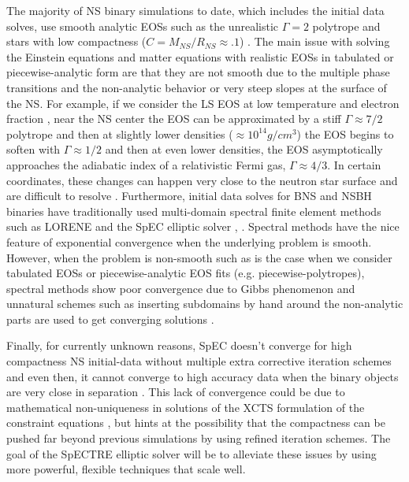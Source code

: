 
 The majority of NS binary simulations to date, which includes the initial data solves, use smooth analytic EOSs such as the unrealistic $\Gamma = 2$ polytrope and stars with low compactness ($C = M_{NS}/R_{NS} \approx .1$) \cite{faber2012binary}. The main issue with solving the Einstein equations and matter equations with realistic EOSs in tabulated or piecewise-analytic form are that they are not smooth due to the multiple phase transitions and the non-analytic behavior or very steep slopes at the surface of the NS. For example, if we consider the LS EOS at low temperature and electron fraction \cite{lswebsite}, near the NS center the EOS can be approximated by a stiff $\Gamma \approx 7/2$ polytrope and then at slightly lower densities ($\approx 10^{14} g/cm^{3}$) the EOS begins to soften with $\Gamma \approx 1/2$ and then at even lower densities, the EOS asymptotically approaches the adiabatic index of a relativistic Fermi gas, $\Gamma \approx 4/3$. In certain coordinates, these changes can happen very close to the neutron star surface and are difficult to resolve \cite{deaton2013black}. Furthermore, initial data solves for BNS and NSBH binaries have traditionally used multi-domain spectral finite element methods such as LORENE \cite{gourgoulhon2001quasiequilibrium} and the SpEC elliptic solver \cite{pfeiffer2003multidomain}, \cite{ossokine2015improvements}. Spectral methods have the nice feature of exponential convergence when the underlying problem is smooth. However, when the problem is non-smooth such as is the case when we consider tabulated EOSs or piecewise-analytic EOS fits (e.g. piecewise-polytropes), spectral methods show poor convergence due to Gibbs phenomenon and unnatural schemes such as inserting subdomains by hand around the non-analytic parts are used to get converging solutions \cite{deaton2013black}. 

Finally, for currently unknown reasons, SpEC doesn't converge for high compactness NS initial-data without multiple extra corrective iteration schemes and even then, it cannot converge to high accuracy data when the binary objects are very close in separation \cite{henriksson2014initial}. This lack of convergence could be due to mathematical non-uniqueness in solutions of the XCTS formulation of the constraint equations \cite{cordero2009improved}, but \cite{henriksson2014initial} hints at the possibility that the compactness can be pushed far beyond previous simulations by using refined iteration schemes. The goal of the SpECTRE elliptic solver will be to alleviate these issues by using more powerful, flexible techniques that scale well.

